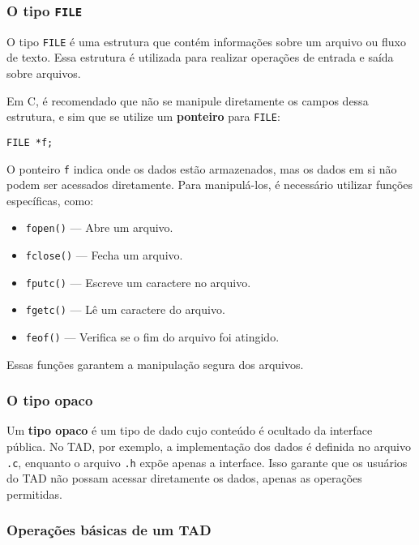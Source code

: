 \subsubsection{O tipo \texttt{FILE}}

O tipo \texttt{FILE} é uma estrutura que contém informações sobre um arquivo ou fluxo de texto. Essa estrutura é utilizada para realizar operações de entrada e saída sobre arquivos.

Em C, é recomendado que não se manipule diretamente os campos dessa estrutura, e sim que se utilize um \textbf{ponteiro} para \texttt{FILE}:

\begin{verbatim}
FILE *f;
\end{verbatim}

O ponteiro \texttt{f} indica onde os dados estão armazenados, mas os dados em si não podem ser acessados diretamente. Para manipulá-los, é necessário utilizar funções específicas, como:

\begin{itemize}
    \item \texttt{fopen()} --- Abre um arquivo.
    \item \texttt{fclose()} --- Fecha um arquivo.
    \item \texttt{fputc()} --- Escreve um caractere no arquivo.
    \item \texttt{fgetc()} --- Lê um caractere do arquivo.
    \item \texttt{feof()} --- Verifica se o fim do arquivo foi atingido.
\end{itemize}

Essas funções garantem a manipulação segura dos arquivos.

\subsubsection{O tipo opaco}

Um \textbf{tipo opaco} é um tipo de dado cujo conteúdo é ocultado da interface pública. No TAD, por exemplo, a implementação dos dados é definida no arquivo \texttt{.c}, enquanto o arquivo \texttt{.h} expõe apenas a interface. Isso garante que os usuários do TAD não possam acessar diretamente os dados, apenas as operações permitidas.

\subsubsection{Operações básicas de um TAD}

